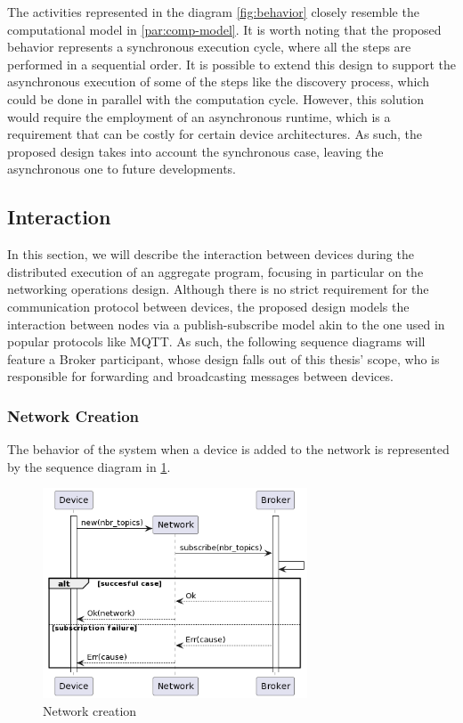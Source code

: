 The activities represented in the diagram \ref{fig:behavior} closely resemble the computational model in \ref{par:comp-model}.
It is worth noting that the proposed behavior represents a synchronous execution cycle, where all the steps are performed in a sequential order. It is possible to extend this design
to support the asynchronous execution of some of the steps like the discovery process, which could be done in parallel with the computation cycle. However, this solution would require the employment of an asynchronous runtime, which is a requirement that can be costly for certain device architectures. As such, the proposed design
takes into account the synchronous case, leaving the asynchronous one to future developments.

\subsection{Interaction}
\label{subsec:interaction}

In this section, we will describe the interaction between devices during the distributed execution of an aggregate program, focusing in particular on the networking operations design.
Although there is no strict requirement for the communication protocol between devices, the proposed design models the interaction between nodes via a publish-subscribe model akin to the one used in popular protocols like MQTT.
As such, the following sequence diagrams will feature a Broker participant, whose design falls out of this thesis' scope, who is responsible for forwarding and broadcasting messages between devices.

\subsubsection{Network Creation}
The behavior of the system when a device is added to the network is represented by the sequence diagram in \cref{fig:network-creation}.

\begin{figure}[ht!]
    \centering
    \includegraphics[width=0.7\textwidth]{figures/diagrams/img/activity-network-creation.png}
    \caption{Network creation}
    \label{fig:network-creation}
\end{figure}

